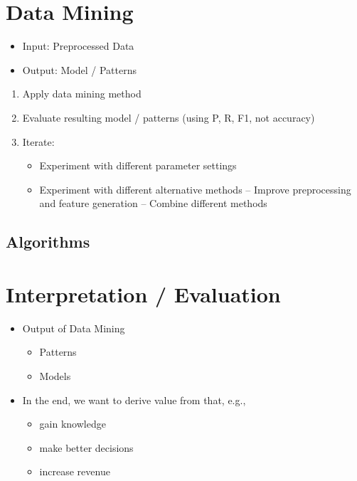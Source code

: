 \chapter{Data Mining}
\label{cha:data_mining}
\begin{itemize}
	\item Input: Preprocessed Data
	\item Output: Model / Patterns
\end{itemize}

\begin{enumerate}
	\item Apply data mining method
	\item Evaluate resulting model / patterns (using P, R, F1, not accuracy)
	\item Iterate:
	\begin{itemize}
		\item Experiment with different parameter settings
		\item Experiment with different alternative methods – Improve preprocessing and feature generation – Combine different methods
	\end{itemize}
\end{enumerate}

\section{Algorithms}



\chapter{Interpretation / Evaluation}
\label{cha:interpretation_evaluation}
\begin{itemize}
	\item Output of Data Mining
	\begin{itemize}
		\item Patterns
		\item Models
	\end{itemize}
	\item In the end, we want to derive value from that, e.g.,
	\begin{itemize}
		\item gain knowledge
		\item make better decisions
		\item increase revenue
	\end{itemize}
\end{itemize}



